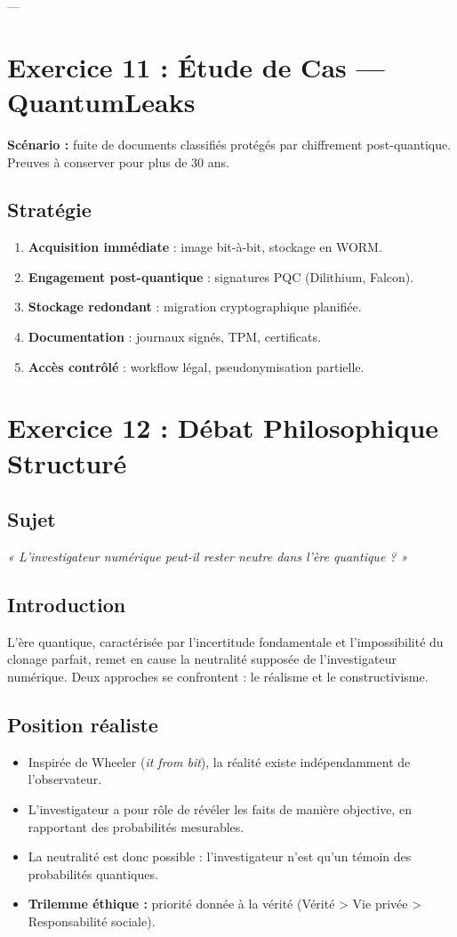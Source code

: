 \documentclass[memoire, 12pt]{report}
\begin{document}
\begin{titlepage}
---

\section*{Exercice 11 : Étude de Cas — QuantumLeaks}

\textbf{Scénario :} fuite de documents classifiés protégés par chiffrement post-quantique.  
Preuves à conserver pour plus de 30 ans.

\subsection*{Stratégie}
\begin{enumerate}
  \item \textbf{Acquisition immédiate} : image bit-à-bit, stockage en WORM.
  \item \textbf{Engagement post-quantique} : signatures PQC (Dilithium, Falcon).
  \item \textbf{Stockage redondant} : migration cryptographique planifiée.
  \item \textbf{Documentation} : journaux signés, TPM, certificats.
  \item \textbf{Accès contrôlé} : workflow légal, pseudonymisation partielle.
\end{enumerate}


\section*{Exercice 12 : Débat Philosophique Structuré}
\subsection*{Sujet}
\textit{« L’investigateur numérique peut-il rester neutre dans l’ère quantique ? »}

\subsection*{Introduction}
L’ère quantique, caractérisée par l’incertitude fondamentale et l’impossibilité du clonage parfait, remet en cause la neutralité supposée de l’investigateur numérique. Deux approches se confrontent : le réalisme et le constructivisme.

\subsection*{Position réaliste}
\begin{itemize}
  \item Inspirée de Wheeler (\textit{it from bit}), la réalité existe indépendamment de l’observateur.
  \item L’investigateur a pour rôle de révéler les faits de manière objective, en rapportant des probabilités mesurables.
  \item La neutralité est donc possible : l’investigateur n’est qu’un témoin des probabilités quantiques.
  \item \textbf{Trilemme éthique :} priorité donnée à la vérité (Vérité > Vie privée > Responsabilité sociale).
\end{itemize}


\end{titlepage}
\end{document}
